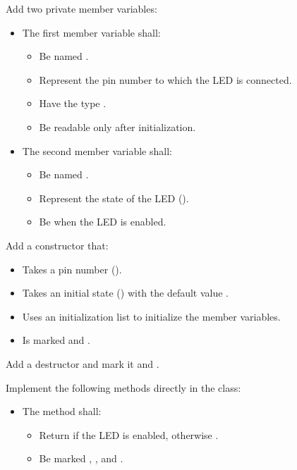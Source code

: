\begin{parts}
  \item Add two private member variables:
  \begin{itemize}
    \item The first member variable shall:
    \begin{itemize}
      \item Be named .
      \item Represent the pin number to which the LED is connected.
      \item Have the type .
      \item Be readable only after initialization.
    \end{itemize}
    \item The second member variable shall:
    \begin{itemize}
      \item Be named .
      \item Represent the state of the LED ().
      \item Be  when the LED is enabled.
    \end{itemize}
  \end{itemize}
  \item Add a constructor that:
  \begin{itemize}
    \item Takes a pin number ().
    \item Takes an initial state () with the default value .
    \item Uses an initialization list to initialize the member variables.
    \item Is marked  and .
  \end{itemize}
  \item Add a destructor and mark it  and .
  \item Implement the following methods directly in the class:
  \begin{itemize}
    \item The method  shall:
    \begin{itemize}
      \item Return  if the LED is enabled, otherwise .
      \item Be marked , , and \code{[[nodiscard]]}.
    \end{itemize}

\end{itemize}
\end{parts}
